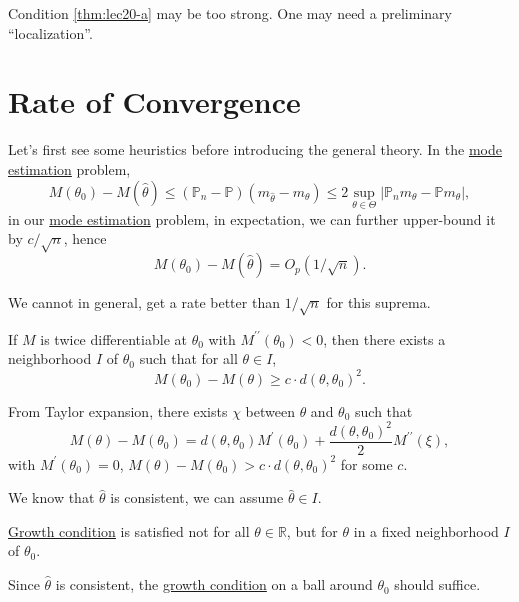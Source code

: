 \begin{remark}
	Condition \autoref{thm:lec20-a} may be too strong. One may need a preliminary ``localization''.
\end{remark}

\section{Rate of Convergence}
Let's first see some heuristics before introducing the general theory. In the \hyperref[prb:mode-estimation]{mode estimation} problem,
\[
	M(\theta _0) - M(\hat{\theta} )
	\leq (\mathbb{P} _n - \mathbb{P} ) (m_{\hat{\theta} } - m_\theta )
	\leq 2 \sup _{\theta \in \Theta } \vert \mathbb{P} _n m_\theta - \mathbb{P} m_\theta  \vert,
\]
in our \hyperref[prb:mode-estimation]{mode estimation} problem, in expectation, we can further upper-bound it by \(c / \sqrt{n} \), hence
\[
	M(\theta _0) - M(\hat{\theta} ) = O_p(1 / \sqrt{n} ).
\]

\begin{note}
	We cannot in general, get a rate better than \(1 / \sqrt{n} \) for this suprema.
\end{note}

\begin{remark}
	If \(M\) is twice differentiable at \(\theta _0\) with \(M^{\prime\prime} (\theta _0) < 0\), then there exists a neighborhood \(I\) of \(\theta _0\) such that for all \(\theta \in I\),
	\[
		M(\theta _0) - M(\theta ) \geq c \cdot d(\theta, \theta _0)^2.
	\]
\end{remark}
\begin{explanation}
	From Taylor expansion, there exists \(\chi\) between \(\theta \) and \(\theta _0\) such that
	\[
		M(\theta ) - M(\theta _0)
		= d(\theta, \theta _0) M^{\prime} (\theta _0) + \frac{d(\theta, \theta _0)^2}{2} M^{\prime\prime} (\xi ),
	\]
	with \(M^{\prime} (\theta _0) = 0\), \(M(\theta ) - M(\theta _0) > c \cdot d(\theta, \theta _0)^2\) for some \(c\).
\end{explanation}

We know that \(\hat{\theta} \) is consistent, we can assume \(\hat{\theta} \in I\).

\begin{remark}
	\hyperref[def:growth-condition]{Growth condition} is satisfied not for all \(\theta \in \mathbb{R} \), but for \(\theta \) in a fixed neighborhood \(I\) of \(\theta _0\).
\end{remark}

\begin{intuition}
	Since \(\hat{\theta} \) is consistent, the \hyperref[def:growth-condition]{growth condition} on a ball around \(\theta _0\) should suffice.
\end{intuition}

